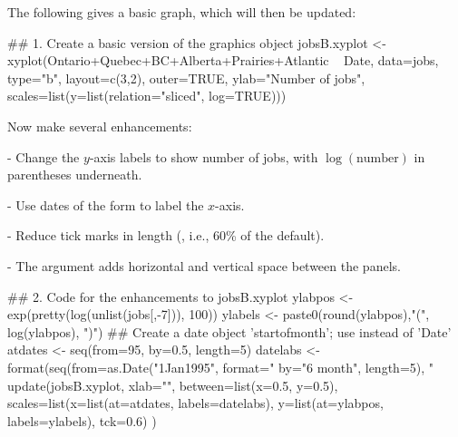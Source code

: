 The following gives a basic graph, which will then be updated:
\noindent
\begin{fullwidth}

\begin{Schunk}
\begin{Sinput}
## 1. Create a basic version of the graphics object
jobsB.xyplot <-
  xyplot(Ontario+Quebec+BC+Alberta+Prairies+Atlantic ~ Date,
         data=jobs, type="b", layout=c(3,2), outer=TRUE,
         ylab="Number of jobs",
         scales=list(y=list(relation="sliced", log=TRUE)))
\end{Sinput}
\end{Schunk}

\end{fullwidth}

\noindent
Now make several enhancements:
\begin{itemizz}
\item[-] Change the $y$-axis labels to show number of jobs, with
$\log(\mbox{number})$ in parentheses underneath.
\item[-] Use dates of the form  to label the
  $x$-axis.
\item[-] Reduce tick marks in length (, i.e.,
60\% of the default).
\item[-] The argument  adds
  horizontal and vertical space between the panels.
\end{itemizz}

\begin{fullwidth}

\begin{Schunk}
\begin{Sinput}
## 2. Code for the enhancements to jobsB.xyplot
ylabpos <- exp(pretty(log(unlist(jobs[,-7])), 100))
ylabels <- paste0(round(ylabpos),"\n(", log(ylabpos), ")")
## Create a date object 'startofmonth'; use instead of 'Date'
atdates <- seq(from=95, by=0.5, length=5)
datelabs <- format(seq(from=as.Date("1Jan1995", format="%
                       by="6 month", length=5), "%
update(jobsB.xyplot, xlab="", between=list(x=0.5, y=0.5),
       scales=list(x=list(at=atdates, labels=datelabs),
                   y=list(at=ylabpos, labels=ylabels), tck=0.6) )
\end{Sinput}
\end{Schunk}

\end{fullwidth}

